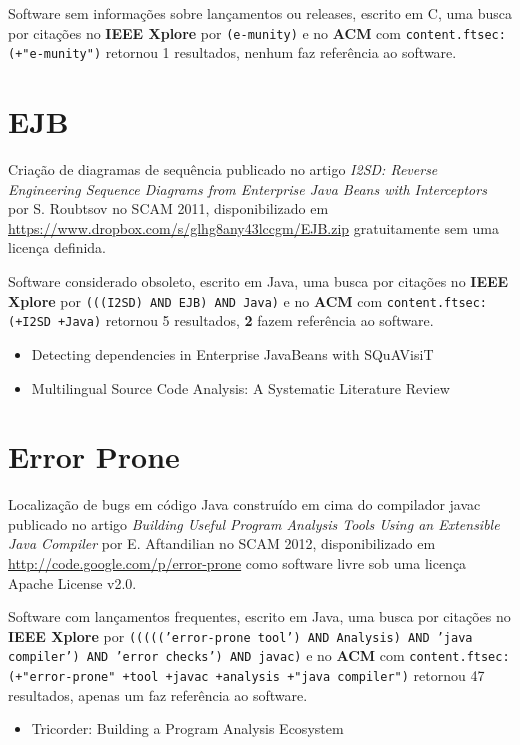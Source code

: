 Software sem informações sobre lançamentos ou releases,
escrito em C,
uma busca por citações no {\bf IEEE Xplore} por
\texttt{(e-munity)}
e no {\bf ACM} com
\texttt{content.ftsec:(+"e-munity")}
retornou
1 resultados,
nenhum faz referência ao software.



\section{EJB}

Criação de diagramas de sequência
publicado no artigo {\it I2SD: Reverse Engineering Sequence Diagrams from Enterprise Java Beans with Interceptors}
por S. Roubtsov
no SCAM 2011,
disponibilizado em \url{https://www.dropbox.com/s/glhg8any43lccgm/EJB.zip}
gratuitamente
sem uma licença definida.

Software considerado obsoleto,
escrito em Java,
uma busca por citações no {\bf IEEE Xplore} por
\texttt{(((I2SD) AND EJB) AND Java)}
e no {\bf ACM} com
\texttt{content.ftsec:(+I2SD +Java)}
retornou
5 resultados,
{\bf 2} fazem referência ao software.

\begin{itemize}
\item Detecting dependencies in Enterprise JavaBeans with SQuAVisiT
\item Multilingual Source Code Analysis: A Systematic Literature Review
\end{itemize}


\section{Error Prone}

Localização de bugs em código Java construído em cima do compilador javac
publicado no artigo {\it Building Useful Program Analysis Tools Using an Extensible Java Compiler}
por E. Aftandilian
no SCAM 2012,
disponibilizado em \url{http://code.google.com/p/error-prone}
como software livre
sob uma licença Apache License v2.0.

Software com lançamentos frequentes,
escrito em Java,
uma busca por citações no {\bf IEEE Xplore} por
\texttt{((((('error-prone tool') AND Analysis) AND 'java compiler') AND 'error checks') AND javac)}
e no {\bf ACM} com
\texttt{content.ftsec:(+"error-prone" +tool +javac +analysis +"java compiler")}
retornou
47 resultados,
apenas um faz referência ao software.

\begin{itemize}
\item Tricorder: Building a Program Analysis Ecosystem
\end{itemize}

